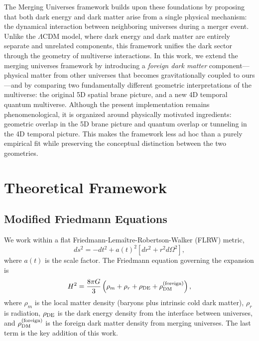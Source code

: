 \documentclass[12pt]{article}
\begin{document}
The Merging Universes framework builds upon these foundations by proposing that both dark energy and dark matter arise from a single physical mechanism: the dynamical interaction between neighboring universes during a merger event. Unlike the $\Lambda$CDM model, where dark energy and dark matter are entirely separate and unrelated components, this framework unifies the dark sector through the geometry of multiverse interactions. In this work, we extend the merging universes framework by introducing a \textit{foreign dark matter} component---physical matter from other universes that becomes gravitationally coupled to ours---and by comparing two fundamentally different geometric interpretations of the multiverse: the original 5D spatial brane picture, and a new 4D temporal quantum multiverse. Although the present implementation remains phenomenological, it is organized around physically motivated ingredients: geometric overlap in the 5D brane picture and quantum overlap or tunneling in the 4D temporal picture. This makes the framework less ad hoc than a purely empirical fit while preserving the conceptual distinction between the two geometries.

\section{Theoretical Framework}

\subsection{Modified Friedmann Equations}

We work within a flat Friedmann-Lema\^{i}tre-Robertson-Walker (FLRW) metric,
\begin{equation}
ds^2 = -dt^2 + a(t)^2 \left[ dr^2 + r^2 d\Omega^2 \right],
\end{equation}
where $a(t)$ is the scale factor. The Friedmann equation governing the expansion is
\begin{equation}
H^2 = \frac{8\pi G}{3} \left( \rho_m + \rho_r + \rho_{\rm DE} + \rho_{\rm DM}^{\rm (foreign)} \right),
\label{eq:friedmann}
\end{equation}
where $\rho_m$ is the local matter density (baryons plus intrinsic cold dark matter), $\rho_r$ is radiation, $\rho_{\rm DE}$ is the dark energy density from the interface between universes, and $\rho_{\rm DM}^{\rm (foreign)}$ is the foreign dark matter density from merging universes. The last term is the key addition of this work.
\end{document}
